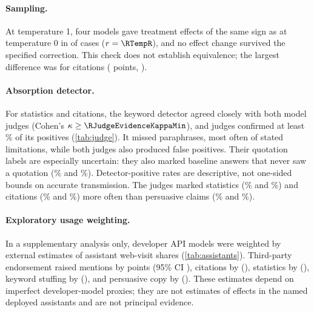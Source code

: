 \begin{table}[htbp]
\centering\small
\caption{Effects on mentions in the \FlNModelsTwo{} replication models (percentage points; ${}^{*}$ Holm-corrected
$p<0.05$ within each model), next to the pooled effect in the 12 main models. Treatments are ordered by their effect
in the main analysis.}
\label{tab:flagship}
\resizebox{\linewidth}{!}{}
\end{table}

\paragraph{Sampling.} At temperature 1, four models gave treatment effects of the same
sign as at temperature 0 in \RTempSame{} of \RTempPairs{} cases ($r = \RTempR$), and no effect change survived the
specified correction. This check does not establish equivalence; the largest difference was for citations (\RTempChangeCitations{}
points, \RTempChangeCitationsCI).

\paragraph{Absorption detector.} For statistics and citations, the keyword detector agreed closely with both model
judges (Cohen's $\kappa \geq \RJudgeEvidenceKappaMin$), and judges confirmed at least \RJudgePrecisionMin\% of its
positives (\cref{tab:judge}). It missed paraphrases, most often of stated limitations, while both judges also produced
false positives. Their quotation labels are especially uncertain: they also marked baseline answers that never saw a
quotation (\RJudgeHaikuQuotationFP\% and \RJudgeDeepseekQuotationFP\%). Detector-positive rates are descriptive, not
one-sided bounds on accurate transmission. The judges marked statistics (\RJudgeHaikuStatisticsRate\% and
\RJudgeDeepseekStatisticsRate\%) and citations (\RJudgeHaikuCitationsRate\% and \RJudgeDeepseekCitationsRate\%) more
often than persuasive claims (\RJudgeHaikuPersuasiveRate\% and \RJudgeDeepseekPersuasiveRate\%).

\paragraph{Exploratory usage weighting.} In a supplementary analysis only, developer API models were weighted by
external estimates of assistant web-visit shares (\cref{tab:assistants}). Third-party endorsement raised mentions by
\RUwThirdPartyU{} points (95\% CI \RUwThirdPartyCI), citations by \RUwCitationsU{} (\RUwCitationsCI), statistics by
\RUwStatisticsU{} (\RUwStatisticsCI), keyword stuffing by \RUwKeywordStuffingU{} (\RUwKeywordStuffingCI), and
persuasive copy by \RUwPersuasiveU{} (\RUwPersuasiveCI). These estimates depend on imperfect developer-model proxies;
they are not estimates of effects in the named deployed assistants and are not principal evidence.

